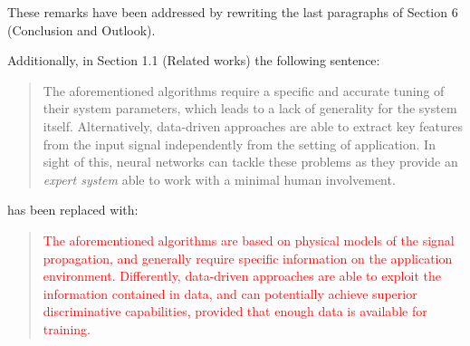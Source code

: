 \documentclass[11pt, technote, letterpaper, oneside, onecolumn]{IEEEtran}
\begin{document}
\begin{enumerate}
These remarks have been addressed by rewriting the last paragraphs of  Section 6 (Conclusion and Outlook).

Additionally, in Section 1.1 (Related works) the following sentence:
\begin{quote}
The aforementioned algorithms require a specific and accurate tuning of their system parameters, which leads to a lack of generality for the system itself. Alternatively, data-driven approaches are able to extract key features from the input signal independently from the setting of application. In sight of this, neural networks can tackle these problems as they provide an \textit{expert system} able to work with a minimal human involvement.
\end{quote}
has been replaced with:
\begin{quote}
\textcolor{red}{The aforementioned algorithms are based on physical models of the signal propagation, and generally require specific information on the application environment. Differently, data-driven approaches are able to exploit the information contained in data, and can potentially achieve superior discriminative capabilities, provided that enough data is available for training.}
\end{quote}

 
 

\end{enumerate}
\end{document}
